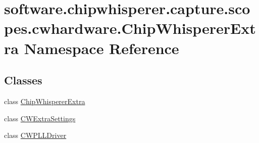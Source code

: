 \hypertarget{namespacesoftware_1_1chipwhisperer_1_1capture_1_1scopes_1_1cwhardware_1_1ChipWhispererExtra}{}\section{software.\+chipwhisperer.\+capture.\+scopes.\+cwhardware.\+Chip\+Whisperer\+Extra Namespace Reference}
\label{namespacesoftware_1_1chipwhisperer_1_1capture_1_1scopes_1_1cwhardware_1_1ChipWhispererExtra}
\subsection*{Classes}
\begin{DoxyCompactItemize}
\item 
class \hyperlink{classsoftware_1_1chipwhisperer_1_1capture_1_1scopes_1_1cwhardware_1_1ChipWhispererExtra_1_1ChipWhispererExtra}{Chip\+Whisperer\+Extra}
\item 
class \hyperlink{classsoftware_1_1chipwhisperer_1_1capture_1_1scopes_1_1cwhardware_1_1ChipWhispererExtra_1_1CWExtraSettings}{C\+W\+Extra\+Settings}
\item 
class \hyperlink{classsoftware_1_1chipwhisperer_1_1capture_1_1scopes_1_1cwhardware_1_1ChipWhispererExtra_1_1CWPLLDriver}{C\+W\+P\+L\+L\+Driver}
\end{DoxyCompactItemize}
